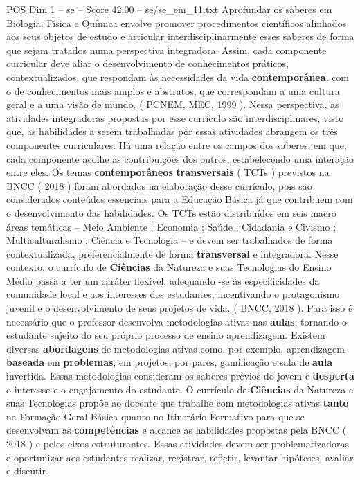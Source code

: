 \begin{textsample}{POS Dim 1 – se – Score 42.00 – se/se\_em\_11.txt}
Aprofundar os saberes em Biologia, Física e Química envolve promover procedimentos científicos alinhados aos seus objetos de estudo e articular interdisciplinarmente esses saberes de forma que sejam tratados numa perspectiva integradora.
Assim, cada componente curricular deve aliar o desenvolvimento de conhecimentos práticos, contextualizados, que respondam às necessidades da vida \textbf{contemporânea}, com o de conhecimentos mais amplos e abstratos, que correspondam a uma cultura geral e a uma visão de mundo. ( PCNEM, MEC, 1999 ).
Nessa perspectiva, as atividades integradoras propostas por esse currículo são interdisciplinares, visto que, as habilidades a serem trabalhadas por essas atividades abrangem os três componentes curriculares.
Há uma relação entre os campos dos saberes, em que, cada componente acolhe as contribuições dos outros, estabelecendo uma interação entre eles.
Os temas \textbf{contemporâneos} \textbf{transversais} ( TCTs ) previstos na BNCC ( 2018 ) foram abordados na elaboração desse currículo, pois são considerados conteúdos essenciais para a Educação Básica já que contribuem com o desenvolvimento das habilidades.
Os TCTs estão distribuídos em seis macro áreas temáticas – Meio Ambiente ; Economia ; Saúde ; Cidadania e Civismo ; Multiculturalismo ; Ciência e Tecnologia – e devem ser trabalhados de forma contextualizada, preferencialmente de forma \textbf{transversal} e integradora.
Nesse contexto, o currículo de \textbf{Ciências} da Natureza e suas Tecnologias do Ensino Médio passa a ter um caráter flexível, adequando -se às especificidades da comunidade local e aos interesses dos estudantes, incentivando o protagonismo juvenil e o desenvolvimento de seus projetos de vida. ( BNCC, 2018 ).
Para isso é necessário que o professor desenvolva metodologias ativas nas \textbf{aulas}, tornando o estudante sujeito do seu próprio processo de ensino aprendizagem.
Existem diversas \textbf{abordagens} de metodologias ativas como, por exemplo, aprendizagem \textbf{baseada} em \textbf{problemas}, em projetos, por pares, gamificação e sala de \textbf{aula} invertida.
Essas metodologias consideram os saberes prévios do jovem e \textbf{desperta} o interesse e o engajamento do estudante.
O currículo de \textbf{Ciências} da Natureza e suas Tecnologias propõe ao docente que trabalhe com metodologias ativas \textbf{tanto} na Formação Geral Básica quanto no Itinerário Formativo para que se desenvolvam as \textbf{competências} e alcance as habilidades propostas pela BNCC ( 2018 ) e pelos eixos estruturantes.
Essas atividades devem ser problematizadoras e oportunizar aos estudantes realizar, registrar, refletir, levantar hipóteses, avaliar e discutir.

\end{textsample}
